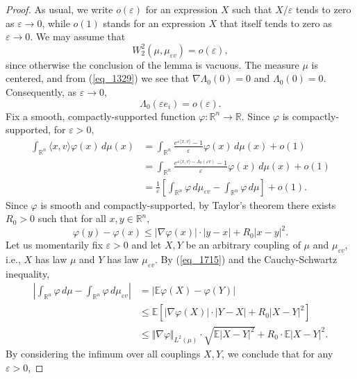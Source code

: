 \documentclass[12pt,a4paper]{article}
\newcommand{\EE}{\mathbb{E}}
\newcommand{\RR}{\mathbb{R}}
\newcommand{\R}{\mathbb{R}}
\newcommand{\eps}{\varepsilon}
\renewcommand{\epsilon}{\varepsilon}
\newcommand{\vphi}{\varphi}
\renewcommand{\phi}{\varphi}
\theoremstyle{definition}
\begin{document}
\begin{proof} 
As usual, we write $o(\eps)$ for an expression $X$ such that $X / \eps$ tends to zero as $\eps \to 0$,
while $o(1)$ stands for an expression $X$ that itself tends to zero as $\eps \to 0$. We may assume that
\begin{equation} \label{eq_ffrriznvoen}
W^2_2 (\mu ,\mu_{\epsilon v} )= o(\epsilon) ,
\end{equation}
since otherwise the conclusion of the lemma is vacuous. 
The measure $\mu$ is centered, and from (\ref{eq_1329}) we see that $\nabla \Lambda_0(0) = 0$ and $\Lambda_0(0) = 0$.
Consequently, as $\eps \rightarrow 0$, $$ \Lambda_0(\eps e_i) = o(\eps). $$
Fix a smooth, compactly-supported function $\vphi: \RR^n \rightarrow \RR$. Since $\vphi$ is compactly-supported, for $\eps > 0$,
\begin{equation} \label{eq_1010}
\begin{split}
\int_{\RR^n} \langle x,v\rangle \vphi(x) \, d \mu(x) &
= \int_{\RR^n} \frac{e^{\eps \langle x, v\rangle} - 1}{\eps} \vphi(x)
\, d \mu(x) + o(1)
\\ & = \int_{\RR^n} \frac{e^{\eps \langle x,v\rangle - \Lambda_0(\eps v)} - 1}{\eps}  \vphi(x) \, d \mu( x) + o(1)  \\
& = \frac{1}{\eps} \left[ \int_{\RR^n} \vphi \, d \mu_{\epsilon v} - \int_{\RR^n} \vphi \, d \mu \right] + o(1) .
\end{split}
\end{equation}
Since $\vphi$ is smooth and compactly-supported, by Taylor's theorem there exists $R_0 > 0$ such that for all $x,y \in \RR^n$,
\begin{equation}  \vphi(y) - \vphi(x) \leq |\nabla \vphi(x)| \cdot |y -x| + R_0 |x-y|^2. \label{eq_1715} \end{equation}
Let us momentarily fix $\eps > 0$ and let $X,Y$ be an arbitrary coupling of $\mu$ and $\mu_{\eps v}$, i.e., $X$ has law $\mu$
and $Y$ has law $\mu_{\eps v}$. 
By (\ref{eq_1715}) and the Cauchy-Schwartz inequality,
\[
\begin{split}
\left\vert \int_{\R^n} \phi \, d \mu
- \int_{\R^n} \phi \, d\mu_{\epsilon v} \right\vert &
= \left\vert \EE \vphi(X) - \vphi(Y)  \right\vert \\
& \leq \EE \left[ |\nabla \vphi(X)| \cdot |Y -X| + R_0 |X-Y|^2 \right] \\
& \leq \Vert \nabla \phi \Vert_{L^2(\mu)}
\cdot \sqrt{ \EE |X- Y|^2 } + R_0 \cdot \EE |X- Y|^2.
\end{split}
\]
By considering the infimum over all couplings $X, Y$, we conclude  that for any $\eps > 0$,

\end{proof}
\end{document}
